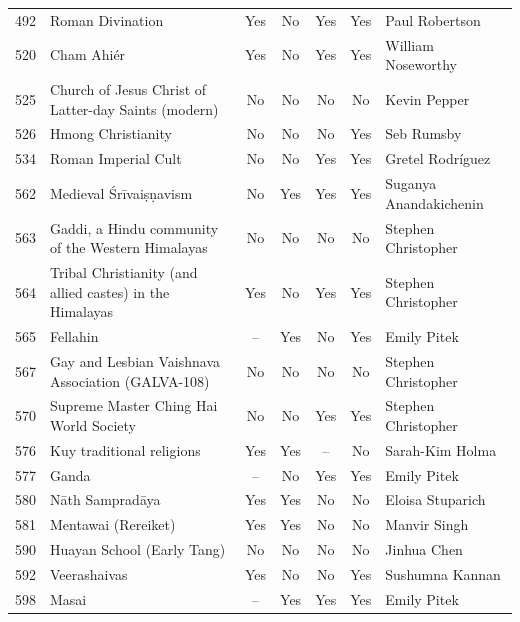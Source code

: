 {\begin{longtable}{rp{3.5cm}ccccp{3cm}}
492 & {\raggedright Roman Divination} & Yes & No & Yes & Yes & {\raggedright Paul Robertson} \\
520 & {\raggedright Cham Ahiér} & Yes & No & Yes & Yes & {\raggedright William Noseworthy} \\
525 & {\raggedright Church of Jesus Christ of Latter-day Saints (modern)} & No & No & No & No & {\raggedright Kevin Pepper} \\
526 & {\raggedright Hmong Christianity} & No & No & No & Yes & {\raggedright Seb Rumsby} \\
534 & {\raggedright Roman Imperial Cult} & No & No & Yes & Yes & {\raggedright Gretel Rodríguez} \\
562 & {\raggedright Medieval Śrīvaiṣṇavism} & No & Yes & Yes & Yes & {\raggedright Suganya Anandakichenin} \\
563 & {\raggedright Gaddi, a Hindu community of the Western Himalayas} & No & No & No & No & {\raggedright Stephen Christopher} \\
564 & {\raggedright Tribal Christianity (and allied castes) in the Himalayas} & Yes & No & Yes & Yes & {\raggedright Stephen Christopher} \\
565 & {\raggedright Fellahin} & -- & Yes & No & Yes & {\raggedright Emily Pitek} \\
567 & {\raggedright Gay and Lesbian Vaishnava Association (GALVA-108)} & No & No & No & No & {\raggedright Stephen Christopher} \\
570 & {\raggedright Supreme Master Ching Hai World Society} & No & No & Yes & Yes & {\raggedright Stephen Christopher} \\
576 & {\raggedright Kuy traditional religions} & Yes & Yes & -- & No & {\raggedright Sarah-Kim Holma} \\
577 & {\raggedright Ganda} & -- & No & Yes & Yes & {\raggedright Emily Pitek} \\
580 & {\raggedright Nāth Sampradāya} & Yes & Yes & No & No & {\raggedright Eloisa Stuparich} \\
581 & {\raggedright Mentawai (Rereiket)} & Yes & Yes & No & No & {\raggedright Manvir Singh} \\
590 & {\raggedright Huayan School (Early Tang)} & No & No & No & No & {\raggedright Jinhua Chen} \\
592 & {\raggedright Veerashaivas} & Yes & No & No & Yes & {\raggedright Sushumna Kannan} \\
598 & {\raggedright Masai} & -- & Yes & Yes & Yes & {\raggedright Emily Pitek} \\

\end{longtable}}
